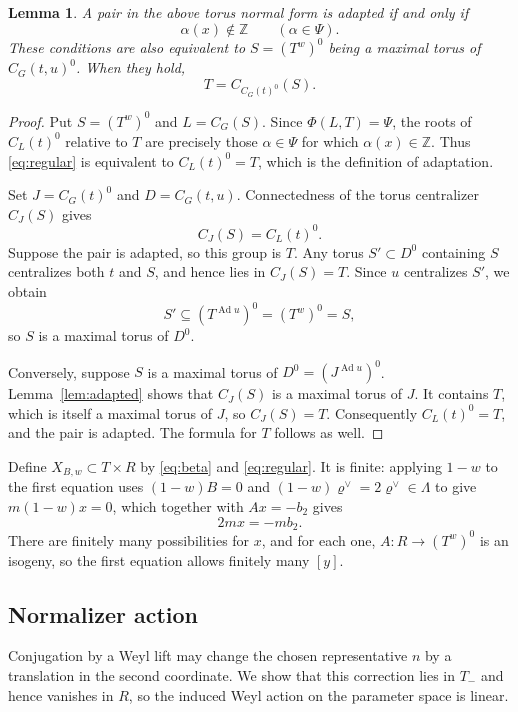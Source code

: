 \documentclass[11pt,a4paper,reqno]{amsart}
\theoremstyle{plain}
\newtheorem{lemma}[theorem]{Lemma}
\theoremstyle{definition}
\theoremstyle{remark}
\numberwithin{equation}{section}
\DeclareMathOperator{\Ad}{Ad}
\newcommand{\ZZ}{\mathbb Z}
\newcommand{\rh}{\varrho^\vee}
\begin{document}
\begin{lemma}\label{lem:criterion} A pair in the above torus normal form is adapted if and only if
\begin{equation}\label{eq:regular}
\alpha(x)\notin\ZZ\qquad(\alpha\in\Psi).
\end{equation}
These conditions are also equivalent to $S=(T^w)^0$ being a maximal torus of $C_G(t,u)^0$. When they hold,
\[
T=C_{C_G(t)^0}(S).
\]
\end{lemma}
\begin{proof}
Put $S=(T^w)^0$ and $L=C_G(S)$. Since $\Phi(L,T)=\Psi$, the roots of $C_L(t)^0$ relative to $T$ are precisely those $\alpha\in\Psi$ for which $\alpha(x)\in\ZZ$. Thus \eqref{eq:regular} is equivalent to $C_L(t)^0=T$, which is the definition of adaptation.

Set $J=C_G(t)^0$ and $D=C_G(t,u)$. Connectedness of the torus centralizer $C_J(S)$ gives
\[
C_J(S)=C_L(t)^0.
\]
Suppose the pair is adapted, so this group is $T$. Any torus $S'\subset D^0$ containing $S$ centralizes both $t$ and $S$, and hence lies in $C_J(S)=T$. Since $u$ centralizes $S'$, we obtain
\[
S'\subseteq(T^{\Ad u})^0=(T^w)^0=S,
\]
so $S$ is a maximal torus of $D^0$.

Conversely, suppose $S$ is a maximal torus of $D^0=(J^{\Ad u})^0$. Lemma~\ref{lem:adapted} shows that $C_J(S)$ is a maximal torus of $J$. It contains $T$, which is itself a maximal torus of $J$, so $C_J(S)=T$. Consequently $C_L(t)^0=T$, and the pair is adapted. The formula for $T$ follows as well.
\end{proof}

Define $X_{B,w}\subset T\times R$ by \eqref{eq:beta} and \eqref{eq:regular}. It is finite: applying $1-w$ to the first equation uses $(1-w)B=0$ and $(1-w)\rh=2\rh\in\Lambda$ to give $m(1-w)x=0$, which together with $Ax=-b_2$ gives
\begin{equation}\label{eq:finite}
2mx=-mb_2.
\end{equation}
There are finitely many possibilities for $x$, and for each one, $A\colon R\to(T^w)^0$ is an isogeny, so the first equation allows finitely many $[y]$.

\subsection{Normalizer action}

Conjugation by a Weyl lift may change the chosen representative $n$ by a translation in the second coordinate. We show that this correction lies in $T_-$ and hence vanishes in $R$, so the induced Weyl action on the parameter space is linear.
\end{document}
